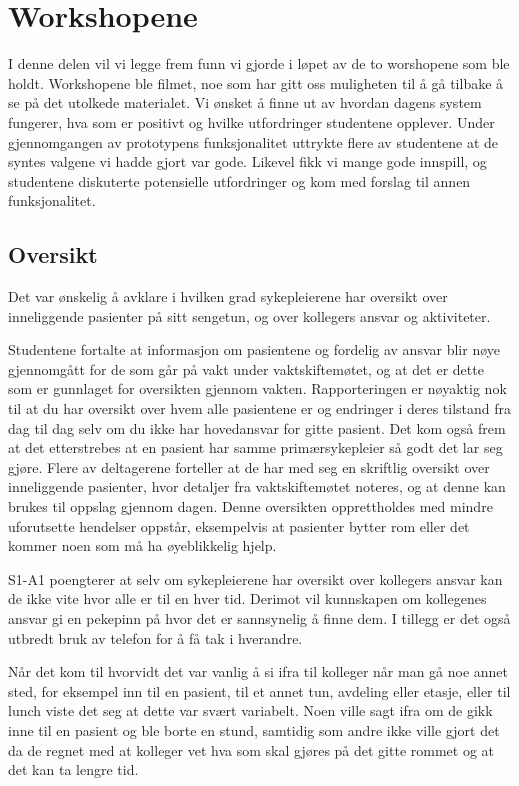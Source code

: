 \section{Workshopene}
\label{ws}

I denne delen vil vi legge frem funn vi gjorde i løpet av de to worshopene som ble holdt. Workshopene ble filmet, noe som har gitt oss muligheten til å gå tilbake å se på det utolkede materialet. Vi ønsket å finne ut av hvordan dagens system fungerer, hva som er positivt og hvilke utfordringer studentene opplever. Under gjennomgangen av prototypens funksjonalitet uttrykte flere av studentene at de syntes valgene vi hadde gjort var gode. Likevel fikk vi mange gode innspill, og studentene diskuterte potensielle utfordringer og kom med forslag til annen funksjonalitet. 


\subsection{Oversikt}
Det var ønskelig å avklare i hvilken grad sykepleierene har oversikt over inneliggende pasienter på sitt sengetun, og over kollegers ansvar og aktiviteter.

\noindent
Studentene fortalte at informasjon om pasientene og fordelig av ansvar blir nøye gjennomgått for de som går på vakt under vaktskiftemøtet, og at det er dette som er gunnlaget for oversikten gjennom vakten. Rapporteringen er nøyaktig nok til at du har oversikt over hvem alle pasientene er og endringer i deres tilstand fra dag til dag selv om du ikke har hovedansvar for gitte pasient. Det kom også frem at det etterstrebes at en pasient har samme primærsykepleier så godt det lar seg gjøre. Flere av deltagerene forteller at de har med seg en skriftlig oversikt over inneliggende pasienter, hvor detaljer fra vaktskiftemøtet noteres, og at denne kan brukes til oppslag gjennom dagen. Denne oversikten opprettholdes med mindre uforutsette hendelser oppstår, eksempelvis at pasienter bytter rom eller det kommer noen som må ha øyeblikkelig hjelp. 

\noindent
S1-A1 poengterer at selv om sykepleierene har oversikt over kollegers ansvar kan de ikke vite hvor alle er til en hver tid. Derimot vil kunnskapen om kollegenes ansvar gi en pekepinn på hvor det er sannsynelig å finne dem. I tillegg er det også utbredt bruk av telefon for å få tak i hverandre. 

\noindent
Når det kom til hvorvidt det var vanlig å si ifra til kolleger når man gå noe annet sted, for eksempel inn til en pasient, til et annet tun, avdeling eller etasje, eller til lunch viste det seg at dette var svært variabelt. Noen ville sagt ifra om de gikk inne til en pasient og ble borte en stund, samtidig som andre ikke ville gjort det da de regnet med at kolleger vet hva som skal gjøres på det gitte rommet og at det kan ta lengre tid.

